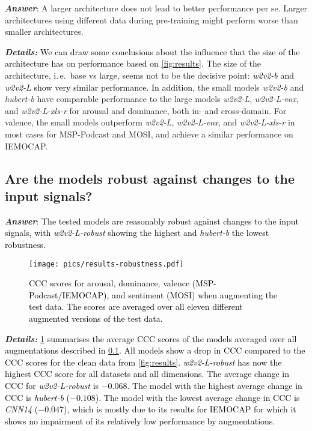 \documentclass{article}
\newcommand\cnn{\mbox{\emph{CNN14}}}
\newcommand\wbase{\mbox{\emph{w2v2-b}}}
\newcommand\hbase{\mbox{\emph{hubert-b}}}
\newcommand\wlarge{\mbox{\emph{w2v2-L}}}
\newcommand\wrobust{\mbox{\emph{w2v2-L-robust}}}
\newcommand\wvox{\mbox{\emph{w2v2-L-vox}}}
\newcommand\wxlsr{\mbox{\emph{w2v2-L-xls-r}}}
\newcommand{\review}[1]{\textcolor{black}{#1}}
\newcommand\msppodcast{\mbox{MSP-Podcast}}
\newcommand\iemocap{\mbox{IEMOCAP}}
\newcommand\mosi{\mbox{MOSI}}
\newcommand{\ie}{i.\,e.\ }
\begin{document}
\emph{\textbf{Answer}}:
A larger architecture does not lead to better performance per se.
Larger architectures using different data during pre-training might perform worse than smaller architectures. 

\noindent
\emph{\textbf{Details:}}
\review{We can draw some conclusions 
about the influence 
that the size of the architecture
has on performance
based on \cref{fig:results}.}
The size of the architecture, \ie base vs large,
seems not to be the decisive point: 
\review{{\wbase} and {\wlarge} show very similar performance.}
\review{In addition,}
the small models {\wbase} and {\hbase} 
have comparable performance 
to the large models {\wlarge}, {\wvox}, and {\wxlsr} 
for arousal and dominance,
both in- and cross-domain. 
For valence, the small models outperform {\wlarge}, {\wvox}, and {\wxlsr}
in most cases for {\msppodcast} and {\mosi},
and achieve a similar performance on {\iemocap}.




\subsection{Are the models robust against changes to the input signals?}
\label{subsec:robustness}

\emph{\textbf{Answer}}:
\review{
The tested models are reasonably robust against changes to the input signals,
with {\wrobust} showing the highest and {\hbase} the lowest robustness.
}

\begin{figure}[t]
    \centering
    \texttt{[image: pics/results-robustness.pdf]}
    \caption{
        \review{
        \ac{CCC} scores for arousal, dominance,
        valence ({\msppodcast}/{\iemocap}), and sentiment ({\mosi})
        when augmenting the test data.
        The scores are averaged over all eleven different
        augmented versions of the test data.
        }
    }
    \label{fig:robustness}
\end{figure}

\noindent
\emph{\textbf{Details:}}
\review{
\cref{fig:robustness} summarises the average \ac{CCC} scores of the models
averaged over all augmentations described in \cref{subsec:robustness}.
All models show a drop in \ac{CCC}
compared to the \ac{CCC} scores for the clean data
from \cref{fig:results}.
{\wrobust} has now the highest \ac{CCC} score
for all datasets and all dimensions.
The average change in \ac{CCC} for {\wrobust} is $-0.068$.
The model with the highest average change in \ac{CCC}
is {\hbase} ($-0.108$).
The model with the lowest average change in \ac{CCC}
is {\cnn} ($-0.047$),
which is mostly due to its results for {\iemocap}
for which it shows no impairment
of its relatively low performance
by augmentations.
}
\end{document}
